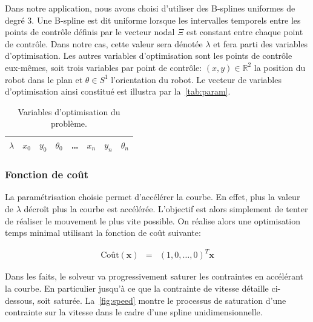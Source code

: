 Dans notre application, nous avons choisi d'utiliser des B-splines
uniformes de degré 3. Une B-spline est dit uniforme lorsque les
intervalles temporels entre les points de contrôle définis par le
vecteur nodal $\Xi$ est constant entre chaque point de contrôle. Dans
notre cas, cette valeur sera dénotée $\lambda$ et fera parti des
variables d'optimisation. Les autres variables d'optimisation sont les
points de contrôle eux-mêmes, soit trois variables par point de
contrôle: $(x,y) \in \mathbb{R}^2$ la position du robot dans le plan
et $\theta \in S^1$ l'orientation du robot. Le vecteur de variables
d'optimisation ainsi constitué est illustra par
la \autoref{tab:param}.

\begin{table}[htbp]
  \begin{center}
\begin{tabular}{|l|l l l|l|l l l|}
  \hline
  $\lambda$
  & $x_0$ & $y_0$ & $\theta_0$
  & \ldots
  & $x_n$ & $y_n$ & $\theta_n$ \\
  \hline
\end{tabular}
  \end{center}
  \caption{Variables d'optimisation du problème. \label{tab:param}}
\end{table}

\subsubsection{Fonction de coût}
\label{sec:chap1_roboptim_cout_cout}


La paramétrisation choisie permet d'accélérer la courbe. En effet,
plus la valeur de $\lambda$ décroît plus la courbe est
accélérée. L'objectif est alors simplement de tenter de réaliser le
mouvement le plus vite possible. On réalise alors une optimisation
temps minimal utilisant la fonction de coût
suivante:

\begin{eqnarray}
\text{Coût}(\mathbf{x}) & = & (1, 0, \dotsc, 0)^T \mathbf{x}
\end{eqnarray}

Dans les faits, le solveur va progressivement saturer les contraintes
en accélérant la courbe. En particulier jusqu'à ce que la contrainte
de vitesse détaille ci-dessous, soit saturée. La \autoref{fig:speed}
montre le processus de saturation d'une contrainte sur la vitesse dans
le cadre d'une spline unidimensionnelle.

